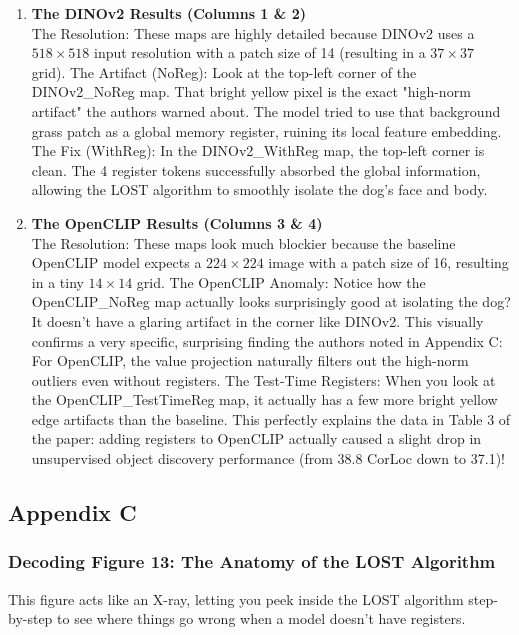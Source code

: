 \documentclass[12pt]{article}
\begin{document}
\begin{enumerate}
    \item \textbf{The DINOv2 Results (Columns 1 \& 2)}\\
        The Resolution: These maps are highly detailed because DINOv2 uses a $518 \times 518$ input resolution with a patch size of 14 (resulting in a $37 \times 37$ grid).
        The Artifact (NoReg): Look at the top-left corner of the DINOv2\_NoReg map. That bright yellow pixel is the exact "high-norm artifact" the authors warned about. The model tried to use that background grass patch as a global memory register, ruining its local feature embedding.
        The Fix (WithReg): In the DINOv2\_WithReg map, the top-left corner is clean. The 4 register tokens successfully absorbed the global information, allowing the LOST algorithm to smoothly isolate the dog's face and body.

    \item \textbf{The OpenCLIP Results (Columns 3 \& 4)}\\
        The Resolution: These maps look much blockier because the baseline OpenCLIP model expects a $224 \times 224$ image with a patch size of 16, resulting in a tiny $14 \times 14$ grid.
        The OpenCLIP Anomaly: Notice how the OpenCLIP\_NoReg map actually looks surprisingly good at isolating the dog? It doesn't have a glaring artifact in the corner like DINOv2. This visually confirms a very specific, surprising finding the authors noted in Appendix C: For OpenCLIP, the value projection naturally filters out the high-norm outliers even without registers.
        The Test-Time Registers: When you look at the OpenCLIP\_TestTimeReg map, it actually has a few more bright yellow edge artifacts than the baseline. This perfectly explains the data in Table 3 of the paper: adding registers to OpenCLIP actually caused a slight drop in unsupervised object discovery performance (from 38.8 CorLoc down to 37.1)!
\end{enumerate}

\subsection{Appendix C}
\subsubsection{Decoding Figure 13: The Anatomy of the LOST Algorithm}
This figure acts like an X-ray, letting you peek inside the LOST algorithm step-by-step to see where things go wrong when a model doesn't have registers.\\
\end{document}
